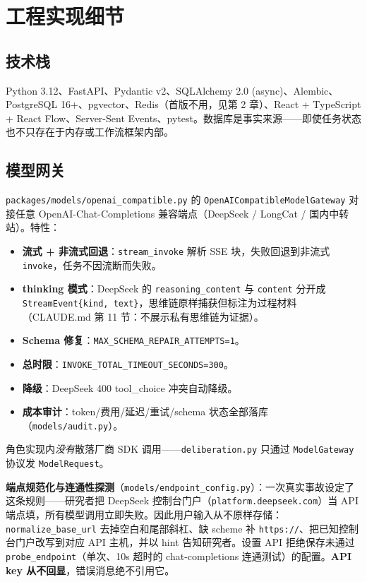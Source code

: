 \section{工程实现细节}

\subsection{技术栈}

Python 3.12、FastAPI、Pydantic v2、SQLAlchemy 2.0 (async)、Alembic、PostgreSQL 16+、pgvector、Redis（首版不用，见第 2 章）、React + TypeScript + React Flow、Server-Sent Events、pytest。数据库是事实来源——即使任务状态也不只存在于内存或工作流框架内部。

\subsection{模型网关}

\texttt{packages/models/openai\_compatible.py} 的 \texttt{OpenAICompatibleModelGateway} 对接任意 OpenAI-Chat-Completions 兼容端点（DeepSeek / LongCat / 国内中转站）。特性：

\begin{itemize}
\item \textbf{流式 + 非流式回退}：\texttt{stream\_invoke} 解析 SSE 块，失败回退到非流式 \texttt{invoke}，任务不因流断而失败。
\item \textbf{thinking 模式}：DeepSeek 的 \texttt{reasoning\_content} 与 \texttt{content} 分开成 \texttt{StreamEvent\{kind, text\}}，思维链原样捕获但标注为过程材料（CLAUDE.md 第 11 节：不展示私有思维链为证据）。
\item \textbf{Schema 修复}：\texttt{MAX\_SCHEMA\_REPAIR\_ATTEMPTS=1}。
\item \textbf{总时限}：\texttt{INVOKE\_TOTAL\_TIMEOUT\_SECONDS=300}。
\item \textbf{降级}：DeepSeek 400 tool\_choice 冲突自动降级。
\item \textbf{成本审计}：token/费用/延迟/重试/schema 状态全部落库（\texttt{models/audit.py}）。
\end{itemize}

角色实现内\emph{没有}散落厂商 SDK 调用——\texttt{deliberation.py} 只通过 \texttt{ModelGateway} 协议发 \texttt{ModelRequest}。

\textbf{端点规范化与连通性探测}（\texttt{models/endpoint\_config.py}）：一次真实事故设定了这条规则——研究者把 DeepSeek 控制台门户（\texttt{platform.deepseek.com}）当 API 端点填，所有模型调用立即失败。因此用户输入从不原样存储：\texttt{normalize\_base\_url} 去掉空白和尾部斜杠、缺 scheme 补 \texttt{https://}、把已知控制台门户改写到对应 API 主机，并以 hint 告知研究者。设置 API 拒绝保存未通过 \texttt{probe\_endpoint}（单次、10s 超时的 chat-completions 连通测试）的配置。\textbf{API key 从不回显}，错误消息绝不引用它。

